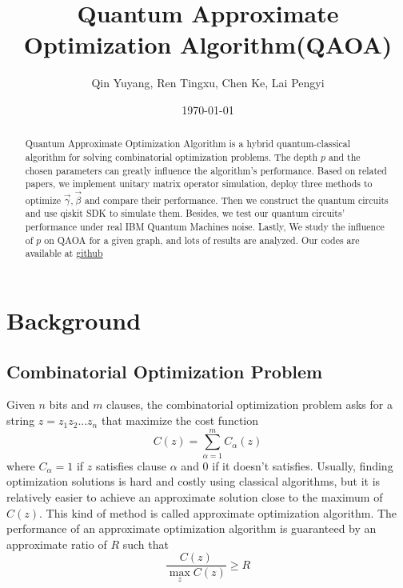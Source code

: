 \documentclass{./source/Report}
\begin{document}
\title{Quantum Approximate Optimization Algorithm(QAOA)}

\author{Qin Yuyang, Ren Tingxu, Chen Ke, Lai Pengyi}

\date{\today}

\begin{abstract}
Quantum Approximate Optimization Algorithm is a hybrid quantum-classical algorithm for solving combinatorial optimization problems. The depth $p$ and the chosen parameters can greatly influence the algorithm's performance. Based on related papers, we implement unitary matrix operator simulation, deploy three methods to optimize $\vec{\gamma}, \vec{\beta}$ and compare their performance. Then we construct the quantum circuits and use qiskit SDK to simulate them. Besides, we test  our quantum circuits' performance under real IBM Quantum Machines noise. Lastly, We study the influence of $p$ on QAOA for a given graph, and lots of results are analyzed. Our codes are available at  \href{https://github.com/qyy2003/QAOA}{github}
\end{abstract}

\maketitle

\section{Background}
\subsection{Combinatorial Optimization Problem}
Given $n$ bits and $m$ clauses, the combinatorial optimization problem asks for a string $z=z_1z_2...z_n$ that maximize the cost function 
\begin{equation}
  C(z) = \sum_{\alpha=1}^mC_{\alpha}(z)
\end{equation}
where $C_{\alpha}=1$ if $z$ satisfies clause $\alpha$ and $0$ if it doesn't satisfies.
Usually, finding optimization solutions is hard and costly using classical algorithms, but it is relatively 
easier to achieve an approximate solution close to the maximum of $C(z)$. This kind of method is called 
approximate optimization algorithm.  The performance of an approximate optimization algorithm is guaranteed by an approximate ratio of $R$
such that 
\begin{equation}
    \frac{C(z)}{\max_{z}C(z)}\ge R
\end{equation}
\end{document}
